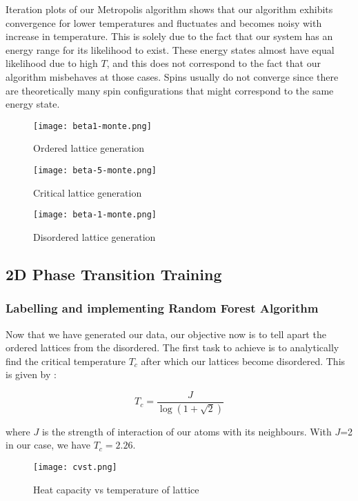 Iteration plots of our Metropolis algorithm shows that our algorithm exhibits convergence for lower temperatures and fluctuates and becomes noisy with increase in temperature.
This is solely due to the fact that our system has an energy range for its likelihood to exist.
These energy states almost have equal likelihood due to high $T$, and this does not correspond to the fact that our algorithm misbehaves at those cases.
Spins usually do not converge since there are theoretically many spin configurations that might correspond to the same energy state.

\begin{figure}[h]
    \centering
    \texttt{[image: beta1-monte.png]}
    \caption{Ordered lattice generation}
\end{figure}

\begin{figure}[h]
    \centering
    \texttt{[image: beta-5-monte.png]}
    \caption{Critical lattice generation}
\end{figure}

\begin{figure}[h]
    \centering
    \texttt{[image: beta-1-monte.png]}
    \caption{Disordered lattice generation}
\end{figure}

\subsection{2D Phase Transition Training}

\subsubsection{Labelling and implementing Random Forest Algorithm}

Now that we have generated our data, our objective now is to tell apart the ordered lattices from the disordered. The first task to achieve is to analytically find the critical temperature $T_c$ after which our lattices become disordered. This is given by \cite{onsager1944crystal}:

\[T_c=\frac{J}{\log(1+\sqrt{2})}\]

where $J$ is the strength of interaction of our atoms with its neighbours. With $J$=2 in our case, we have $T_c=2.26$.

\begin{figure}[h!]
    \centering
    \texttt{[image: cvst.png]}
    \caption{Heat capacity vs temperature of lattice}
\end{figure}

